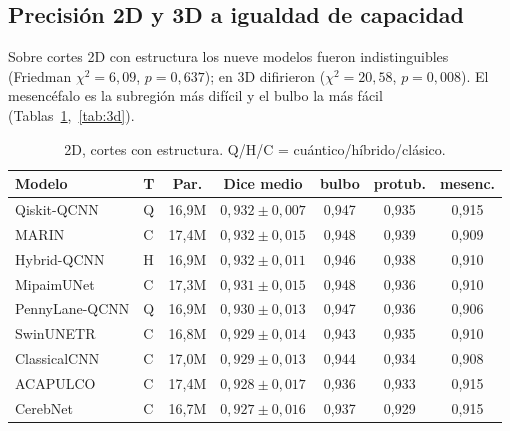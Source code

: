 \documentclass[runningheads]{llncs}
\begin{document}
\subsection{Precisión 2D y 3D a igualdad de capacidad}
Sobre cortes 2D con estructura los nueve modelos fueron indistinguibles (Friedman
$\chi^2{=}6{,}09$, $p{=}0{,}637$); en 3D difirieron ($\chi^2{=}20{,}58$,
$p{=}0{,}008$). El mesencéfalo es la subregión más difícil y el bulbo la más
fácil (Tablas~\ref{tab:2d},~\ref{tab:3d}).

\begin{table}[t]\centering
\caption{2D, cortes con estructura. Q/H/C = cuántico/híbrido/clásico.}
\label{tab:2d}\small\setlength{\tabcolsep}{5pt}
\begin{tabular}{llccccc}
\toprule
Modelo & T & Par. & Dice medio & bulbo & protub. & mesenc.\\
\midrule
Qiskit-QCNN & Q & 16,9M & $0{,}932{\pm}0{,}007$ & 0,947 & 0,935 & 0,915\\
MARIN & C & 17,4M & $0{,}932{\pm}0{,}015$ & 0,948 & 0,939 & 0,909\\
Hybrid-QCNN & H & 16,9M & $0{,}932{\pm}0{,}011$ & 0,946 & 0,938 & 0,910\\
MipaimUNet & C & 17,3M & $0{,}931{\pm}0{,}015$ & 0,948 & 0,936 & 0,910\\
PennyLane-QCNN & Q & 16,9M & $0{,}930{\pm}0{,}013$ & 0,947 & 0,936 & 0,906\\
SwinUNETR & C & 16,8M & $0{,}929{\pm}0{,}014$ & 0,943 & 0,935 & 0,910\\
ClassicalCNN & C & 17,0M & $0{,}929{\pm}0{,}013$ & 0,944 & 0,934 & 0,908\\
ACAPULCO & C & 17,4M & $0{,}928{\pm}0{,}017$ & 0,936 & 0,933 & 0,915\\
CerebNet & C & 16,7M & $0{,}927{\pm}0{,}016$ & 0,937 & 0,929 & 0,915\\
\bottomrule
\end{tabular}
\end{table}
\end{document}
